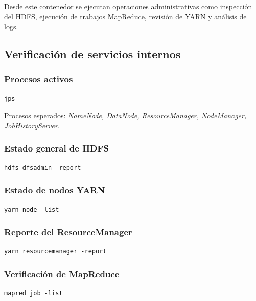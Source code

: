 Desde este contenedor se ejecutan operaciones administrativas como inspección del HDFS, ejecución de trabajos MapReduce, revisión de YARN y análisis de logs.

\subsection{Verificación de servicios internos}

\subsubsection*{Procesos activos}

\begin{verbatim}
jps
\end{verbatim}

Procesos esperados: \textit{NameNode, DataNode, ResourceManager, NodeManager, JobHistoryServer}.

\subsubsection*{Estado general de HDFS}

\begin{verbatim}
hdfs dfsadmin -report
\end{verbatim}

\subsubsection*{Estado de nodos YARN}

\begin{verbatim}
yarn node -list
\end{verbatim}

\subsubsection*{Reporte del ResourceManager}

\begin{verbatim}
yarn resourcemanager -report
\end{verbatim}

\subsubsection*{Verificación de MapReduce}

\begin{verbatim}
mapred job -list
\end{verbatim}

